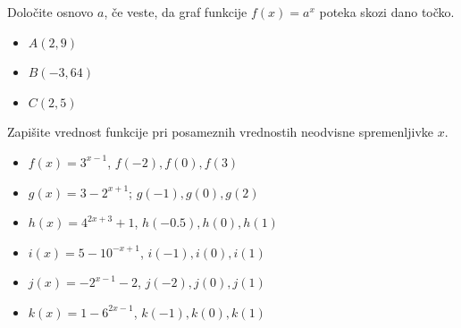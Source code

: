     \begin{naloga}
        Določite osnovo $a$, če veste, da graf funkcije $f(x)=a^x$ poteka skozi dano točko.
            
        \begin{itemize}
            \item $A(2,9)$
            \item $B(-3,64)$
            \item $C(2,5)$
        \end{itemize}

    \end{naloga}


    \begin{naloga}
        Zapišite vrednost funkcije pri posameznih vrednostih neodvisne spremenljivke $x$.
            
        \begin{itemize}
            \item $f(x)=3^{x-1}$, $f(-2), f(0), f(3)$
            \item $g(x)=3-2^{x+1}$; $g(-1), g(0), g(2)$
            \item $h(x)=4^{2x+3}+1$, $h(-0.5), h(0), h(1)$
            \item $i(x)=5-10^{-x+1}$, $i(-1), i(0), i(1)$
            \item $j(x)=-2^{x-1}-2$, $j(-2), j(0), j(1)$
            \item $k(x)=1-6^{2x-1}$, $k(-1), k(0), k(1)$
        \end{itemize}

    \end{naloga}



